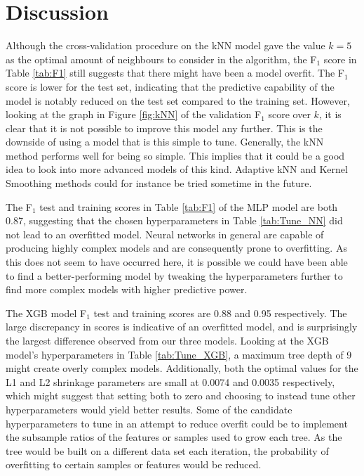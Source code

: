 \documentclass[a4paper, 11pt, twocolumn]{article}
\begin{document}
\section{Discussion}
Although the cross-validation procedure on the kNN model gave the value $k=5$ as 
the optimal amount of neighbours to consider in the algorithm, the F$_1$ score 
in Table \ref{tab:F1} still suggests that there might have been a model overfit. 
The F$_1$ score is lower for the test set, indicating that the predictive 
capability of the model is notably reduced on the test set compared to the 
training set. However, looking at the graph in Figure \ref{fig:kNN} of the 
validation F$_1$ score over $k$, it is clear that it is not possible to improve 
this model any further. This is the downside of using a model that is this simple 
to tune. Generally, the kNN method performs well for being so simple. This implies 
that it could be a good idea to look into more advanced models of this kind. 
Adaptive kNN and Kernel Smoothing methods could for instance be tried sometime in
the future.

The F$_1$ test and training scores in Table \ref{tab:F1} of the MLP model are 
both 0.87, suggesting that the chosen hyperparameters in Table 
\ref{tab:Tune_NN} did not lead to an overfitted model. Neural networks in 
general are capable of producing highly complex models and are consequently 
prone to overfitting. As this does not seem to have occurred here, it is possible 
we could have been able to find a better-performing model by tweaking the 
hyperparameters further to find more complex models with higher predictive 
power. 

The XGB model F$_1$ test and training scores are 0.88 and 0.95 respectively. 
The large discrepancy in scores is indicative of an overfitted model, and is 
surprisingly the largest difference observed from our three models. Looking at 
the XGB model's hyperparameters in Table \ref{tab:Tune_XGB}, a maximum tree 
depth of 9 might create overly complex models. Additionally, both the optimal 
values for the L1 and L2 shrinkage parameters are small at 0.0074 and 0.0035 
respectively, which might suggest that setting both to zero and choosing to 
instead tune other hyperparameters would yield better results. Some of the 
candidate hyperparameters to tune in an attempt to reduce overfit could be to 
implement the subsample ratios of the features or samples used to grow each 
tree. As the tree would be built on a different data set each iteration, the 
probability of overfitting to certain samples or features would be reduced. 
\end{document}
